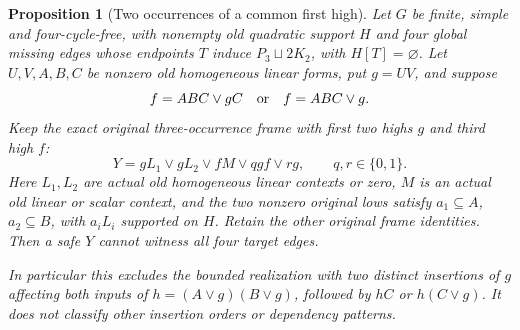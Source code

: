 \documentclass[11pt]{article}
\newtheorem{proposition}[theorem]{Proposition}
\theoremstyle{definition}
\theoremstyle{remark}
\begin{document}
\begin{proposition}[Two occurrences of a common first high]\label{prop:doublefirsthigh}
Let $G$ be finite, simple and four-cycle-free, with nonempty old quadratic support $H$ and four global missing edges whose endpoints $T$ induce $P_3\sqcup2K_2$, with $H[T]=\varnothing$. Let $U,V,A,B,C$ be nonzero old homogeneous linear forms, put $g=UV$, and suppose
\[
 f=ABC\vee gC\quad\hbox{or}\quad f=ABC\vee g.
\]
Keep the exact original three-occurrence frame with first two highs $g$ and third high $f$:
\[
 Y=gL_1\vee gL_2\vee fM\vee qgf\vee rg,
 \qquad q,r\in\{0,1\}.
\]
Here $L_1,L_2$ are actual old homogeneous linear contexts or zero, $M$ is an actual old linear or scalar context, and the two nonzero original lows satisfy
$a_1\subseteq A$, $a_2\subseteq B$, with $a_iL_i$ supported on $H$. Retain the other original frame identities. Then a safe $Y$ cannot witness all four target edges.

In particular this excludes the bounded realization with two distinct insertions of $g$ affecting both inputs of $h=(A\vee g)(B\vee g)$, followed by $hC$ or $h(C\vee g)$. It does not classify other insertion orders or dependency patterns.
\end{proposition}
\end{document}
